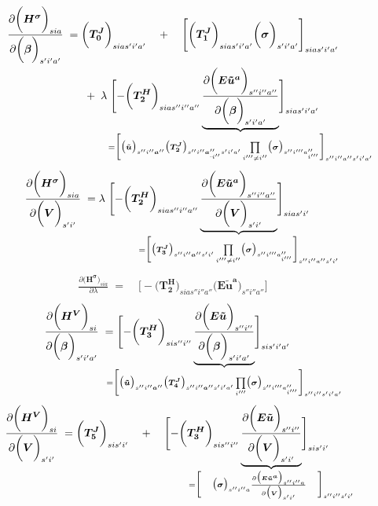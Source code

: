 \documentclass[11pt,fleqn]{article}
\newcommand{\bsigma}{\bm{\sigma}}
\newcommand{\bbeta}{\bm{\beta}}
\newcommand{\bV}{\bm{V}}
\newcommand{\ba}{\bm{a}}
\newcommand{\tu}{\tilde{u}}
\newcommand{\shortminus}{{\text{\scalebox{0.4}[1.0]{\(-\)}}}}
\newcommand{\minusi}{\shortminus i}
\begin{document}
\begin{align*}
	\frac{ \partial \biggl( \bm{H^{\sigma}} \biggr)_{sia} }{ \partial \biggl( \bbeta \biggr)_{s'i'a'} } \;=\; &
		\biggl( \bm{T_0^J} \biggr)_{sias'i'a'} \quad+\quad \Biggl[ \biggl( \bm{T_1^J}\biggr)_{sias'i'a'} \biggl( \bsigma \biggr)_{s'i'a'} \Biggr]_{sias'i'a'} \\
		& \;+\; \lambda \; \Biggl[ - \biggl( \bm{T_2^H}\biggr)_{sias''i''a''} \underbrace{ \frac{ \partial \biggl( \bm{{E\tu^a}} \biggr)_{s''i''a''} }{ \partial \biggl( \bbeta \biggr)_{s'i'a'} } }_{ 
			\mathclap{ = \biggl[ \bigl( \tilde{\bm{u}} \bigr)_{s''i''\ba''} \bigl( \bm{T_2^J} \bigr)_{s''i''\ba_{\minusi''}''s'i'a'} \prod\limits_{i'''\neq i''} \bigl( \bsigma \bigr)_{s''i'''a_{i'''}''} \biggr]_{s''i''a''s'i'a'} } } \Biggr]_{sias'i'a'} 
\end{align*}
\begin{align*}
	\frac{ \partial \biggl( \bm{H^{\sigma}} \biggr)_{sia} }{ \partial \biggl( \bV \biggr)_{s'i'} } \;=\; &
		\lambda \; \Biggl[ - \biggl( \bm{T_2^H}\biggr)_{sias''i''a''} \underbrace{ \frac{ \partial \biggl( \bm{{E\tu^a}} \biggr)_{s''i''a''} }{ \partial \biggl( \bV \biggr)_{s'i'} } }_{ 
			\mathclap{ = \biggl[ \bigl( \bm{T_3^J} \bigr)_{s''i''\ba''s'i'} \prod\limits_{i'''\neq i''} \bigl( \bsigma \bigr)_{s''i'''a_{i'''}''} \biggr]_{s''i''a''s'i'} } } \Biggr]_{sias'i'}
\end{align*}
\begin{align*}
	\frac{ \partial \biggl( \bm{H^{\sigma}} \biggr)_{sia} }{ \partial \lambda } \;=\; &
		\Biggl[ - \biggl( \bm{T_2^H}\biggr)_{sias''i''a''} \biggl( \bm{{E\tu^a}} \biggr)_{s''i''a''} \Biggr]
\end{align*}
\begin{align*}
	\frac{ \partial \biggl( \bm{H^{V}} \biggr)_{si} }{ \partial \biggl( \bbeta \biggr)_{s'i'a'} } \;=\; &
		\Biggl[ - \biggl( \bm{T_3^H} \biggr)_{sis''i''} \underbrace{ \frac{ \partial \biggl( \bm{{E\tu}} \biggr)_{s''i''} }{ \partial \biggl( \bbeta \biggr)_{s'i'a'} } }_{ 
			\mathclap{ = \biggl[ \bigl( \bm{{\tu}} \bigr)_{s''i''\ba''} \bigl( \bm{T_4^J} \bigr)_{s''i''\ba''s'i'a'} \prod\limits_{i'''} \bigl( \bsigma \bigr)_{s''i'''a_{i'''}''} \biggr]_{s''i''s'i'a'} } } \Biggr]_{sis'i'a'}
\end{align*}
\begin{align*}
	\frac{ \partial \biggl( \bm{H^{V}} \biggr)_{si} }{ \partial \biggl( \bV \biggr)_{s'i'} } \;=\; &
		\biggl( \bm{T_5^J} \biggr)_{sis'i'} \quad+\quad 
			\Biggl[ - \biggl( \bm{T_3^H} \biggr)_{sis''i''} \underbrace{ \frac{ \partial \biggl( \bm{{E\tu}} \biggr)_{s''i''} }{ \partial \biggl( \bV \biggr)_{s'i'} } }_{ 
				\mathclap{ = \biggl[ \quad \bigl( \bsigma \bigr)_{s''i''a} \frac{ \partial \bigl( \bm{{E\tu^a}} \bigr)_{s''i''a} }{ \partial \bigl( \bV \bigr)_{s'i'} } \quad \biggr]_{s''i''s'i'} } } \Biggr]_{sis'i'}
\end{align*}
\end{document}
